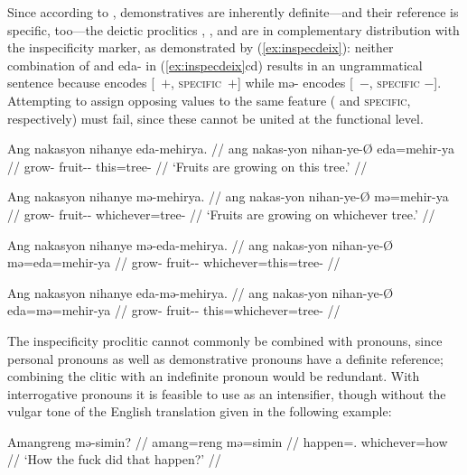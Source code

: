 Since according to \citet[152]{lyons1999}, demonstratives are inherently
definite---and their reference is specific, too---the deictic proclitics
, , and  are in
complementary distribution with the inspecificity marker, as demonstrated by
(\ref{ex:inspecdeix}): neither combination of  and 
{eda-} in (\ref{ex:inspecdeix}cd) results in an ungrammatical sentence because 
 encodes [\Def{}~$+$, \textsc{specific}~$+$] while 
{mə-} encodes [\Def{}~$-$, \textsc{specific} $-$]. Attempting to assign
opposing values to the same feature (\Def{} and \textsc{specific},
respectively) must fail, since these cannot be united at the functional level.

\pex\label{ex:inspecdeix}
\a\label{ex:inspecdeix_1}\begingl
	\gla Ang nakasyon nihanye eda-mehirya. //
	\glb ang nakas-yon nihan-ye-Ø eda=mehir-ya //
	\glc \AgtT{} grow-\TplN{} fruit-\Pl{}-\Top{} this=tree-\Loc{} //
	\glft `Fruits are growing on this tree.' //
\endgl

\a\label{ex:inspecdeix_2}\begingl
	\gla Ang nakasyon nihanye mə-mehirya. //
	\glb ang nakas-yon nihan-ye-Ø mə=mehir-ya //
	\glc \AgtT{} grow-\TplN{} fruit-\Pl{}-\Top{} whichever=tree-\Loc{} //
	\glft `Fruits are growing on whichever tree.' //
\endgl

\a\ljudge*\label{ex:inspecdeix_3}\begingl
	\gla Ang nakasyon nihanye mə-eda-mehirya. //
	\glb ang nakas-yon nihan-ye-Ø mə=eda=mehir-ya //
	\glc \AgtT{} grow-\TplN{} fruit-\Pl{}-\Top{} whichever=this=tree-\Loc{} //
\endgl

\a\ljudge*\label{ex:inspecdeix_4}\begingl
	\gla Ang nakasyon nihanye eda-mə-mehirya. //
	\glb ang nakas-yon nihan-ye-Ø eda=mə=mehir-ya //
	\glc \AgtT{} grow-\TplN{} fruit-\Pl{}-\Top{} this=whichever=tree-\Loc{} //
\endgl

\xe

The inspecificity proclitic  cannot commonly be combined with
pronouns, since personal pronouns as well as demonstrative pronouns have a
definite reference; combining the clitic with an indefinite pronoun would be
redundant. With interrogative pronouns it is feasible to use  as
an intensifier, though without the vulgar tone of the English translation given
in the following example:

\ex\label{ex:meinter}\begingl
	\gla Amangreng mə-simin? //
	\glb amang=reng mə=simin //
	\glc happen=\TsgI{}.\Aarg{} whichever=how //
	\glft `How the fuck did that happen?' //
\endgl\xe

